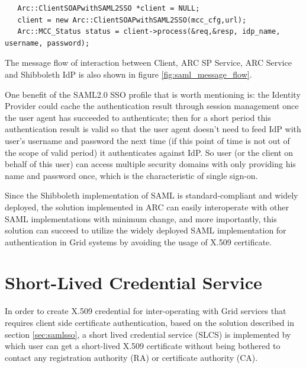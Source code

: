 \documentclass{article}                            %
\begin{document}
\begin{verbatim}
   Arc::ClientSOAPwithSAML2SSO *client = NULL;
   client = new Arc::ClientSOAPwithSAML2SSO(mcc_cfg,url);
   Arc::MCC_Status status = client->process(&req,&resp, idp_name, username, password);
\end{verbatim}

    The message flow of interaction between Client, ARC SP Service, ARC Service and Shibboleth IdP is also shown in figure \ref{fig:saml_message_flow}.

\begin{figure}[ht]
\end{figure}

  One benefit of the SAML2.0 SSO profile that is worth mentioning is: the Identity Provider could cache the authentication result through session management once the user agent has succeeded to authenticate; then for a short period this authentication result is valid so that the user agent doesn’t need to feed IdP with user’s username and password the next time (if this point of time is not out of the scope of valid period) it authenticates against IdP. So user (or the client on behalf of this user) can access multiple security  domains with only providing his name and password once, which is the characteristic of single sign-on.

    Since the Shibboleth implementation of SAML is standard-compliant and widely deployed, the solution implemented in ARC can easily interoperate with other SAML implementations with minimum change, and more importantly, this solution can succeed to utilize the widely deployed SAML implementation for authentication in Grid systems by avoiding the usage of X.509 certificate.




\section{Short-Lived Credential Service} %
\label{sec:slcs}
In order to create X.509 credential for inter-operating with Grid services that requires client side certificate authentication, based on the solution described in section \ref{sec:samlsso}, a short lived credential service (SLCS) is implemented by which user can get a short-lived X.509 certificate without being bothered to contact any registration authority (RA) or certificate authority (CA).
\end{document}
